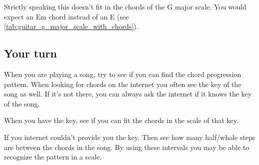 Strictly speaking this doesn't fit in the chords of the G major scale. You would expect an Em chord instead of an E (see \autoref{tab:guitar_g_major_scale_with_chords}).

\subsection{Your turn}

When you are playing a song, try to see if you can find the chord progression pattern. When looking for chords on the internet you often see the key of the song as well. If it's not there, you can always ask the internet if it knows the key of the song.

When you have the key, see if you can fit the chords in the scale of that key.

If you internet couldn't provide you the key. Then see how many half/whole steps are between the chords in the song. By using these intervals you may be able to recognize the pattern in a scale.

